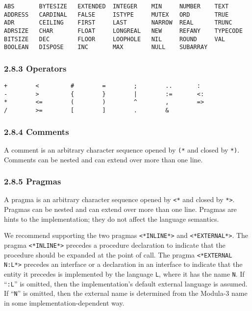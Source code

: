 \documentclass[10pt]{article}
\begin{document}
\begin{verbatim}
ABS       BYTESIZE   EXTENDED  INTEGER    MIN     NUMBER    TEXT
ADDRESS   CARDINAL   FALSE     ISTYPE     MUTEX   ORD       TRUE
ADR       CEILING    FIRST     LAST       NARROW  REAL      TRUNC
ADRSIZE   CHAR       FLOAT     LONGREAL   NEW     REFANY    TYPECODE
BITSIZE   DEC        FLOOR     LOOPHOLE   NIL     ROUND     VAL
BOOLEAN   DISPOSE    INC       MAX        NULL    SUBARRAY
\end{verbatim}

\subsubsection*{2.8.3 Operators}

\begin{verbatim}
+        <         #        =        ;        ..       :
-        >         {        }        |        :=       <:
*        <=        (        )        ^        ,        =>
/        >=        [        ]        .        &
\end{verbatim}

\subsubsection*{2.8.4 Comments}

A comment is an arbitrary character sequence opened by \verb|(*| and closed by
\verb|*)|.  Comments can be nested and can extend over more than one line.

\subsubsection*{2.8.5 Pragmas}

A pragma is an arbitrary character sequence opened by \verb|<*| and closed by
\verb|*>|.  Pragmas can be nested and can extend over more than one line.
Pragmas are hints to the implementation; they do not affect the language
semantics.

We recommend supporting the two pragmas \verb|<*INLINE*>| and
\verb|<*EXTERNAL*>|.  The pragma \verb|<*INLINE*>| precedes a procedure
declaration to indicate that the procedure should be expanded at the point of
call.  The pragma \verb|<*EXTERNAL| \verb|N:L*>| precedes an interface or a
declaration in an interface to indicate that the entity it precedes is
implemented by the language \verb|L|, where it has the name \verb|N|.  If
``\verb|:L|'' is omitted, then the implementation's default external language
is assumed.  If ``\verb|N|'' is omitted, then the external name is determined
from the Modula-3 name in some implementation-dependent way.
\end{document}
